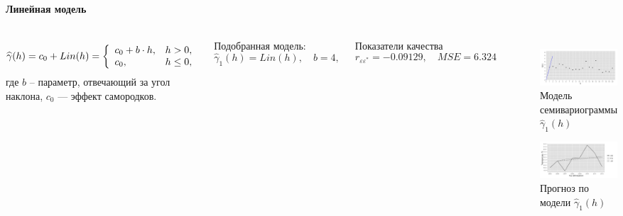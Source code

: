\documentclass[notheorems]{beamer}
\theoremstyle{definition}
\theoremstyle{example}
\theoremstyle{plain}
\begin{document}
\begin{frame}
  \frametitle{\large\subsecname}
  \framesubtitle{Линейная модель}
  \begin{columns}[c]
  \column{3in}
  \begin{equation}\begin{gathered}
  \label{eq:lin}
    \widehat{\gamma}(h) = c_0 + Lin(h) = \left\{
   \begin{array}{l l}
     c_0 + b \cdot h, & h > 0, \\
     c_0, & h \leq 0,
   \end{array} \right.
  \end{gathered}\end{equation}
  где $ b $ -- параметр, отвечающий за угол наклона, $ c_0 $ --- эффект самородков.

  \vspace{0.5em}

  Подобранная модель:
  \begin{equation}
  \label{eq:gamma1}
    \widehat{\gamma}_1(h) = Lin(h), \quad b = 4,
  \end{equation}

  Показатели качества
  \begin{equation*}
    r_{\varepsilon\varepsilon^{*}} = -0.09129, \quad MSE = 6.324
  \end{equation*}

  \column{3in}
  \vspace{-14.5pt}
  \begin{figure}[H]
    \includegraphics[width=0.9\linewidth]{../../figures/variogram/lin-modeled.png} \\
    \caption{Модель семивариограммы $\widehat{\gamma}_1(h)$}
    \includegraphics[width=0.9\linewidth]{../../figures/variogram/lin-cross-prediction.png}
    \caption{Прогноз по модели $\widehat{\gamma}_1(h)$}
  \end{figure}
  \end{columns}
\end{frame}
\end{document}
